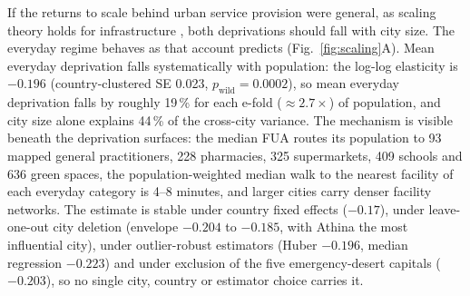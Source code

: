\documentclass[11pt]{article}
\newcommand{\pw}[1]{$p_{\mathrm{wild}} = #1$}
\begin{document}
If the returns to scale behind urban service provision were general, as
scaling theory holds for infrastructure
\citep{bettencourt2007growth,bettencourt2013origins}, both deprivations
should fall with city size. The everyday regime behaves as that account
predicts (Fig.~\ref{fig:scaling}A). Mean everyday deprivation falls
systematically with population: the log-log elasticity is $-0.196$
(country-clustered SE 0.023, \pw{0.0002}), so mean everyday deprivation
falls by roughly 19\,\% for each e-fold ($\approx 2.7\times$) of
population, and city size alone explains 44\,\% of the cross-city
variance. The mechanism is visible beneath the deprivation surfaces: the
median FUA routes its population to 93 mapped general practitioners, 228
pharmacies, 325 supermarkets, 409 schools and 636 green spaces, the
population-weighted median walk to the nearest facility of each everyday
category is 4--8 minutes, and larger cities carry denser facility
networks. The estimate is stable under country fixed effects ($-0.17$),
under leave-one-out city deletion (envelope $-0.204$ to $-0.185$, with
Athina the most influential city), under outlier-robust estimators (Huber
$-0.196$, median regression $-0.223$) and under exclusion of the five
emergency-desert capitals ($-0.203$), so no single city, country or
estimator choice carries it.
\end{document}
